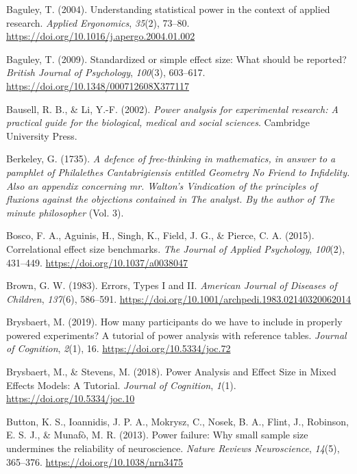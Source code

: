 \documentclass[
  english,
  ,jou, a4paper,floatsintext]{apa6}
\newlength{\cslhangindent}
\newenvironment{cslreferences}%
  {\setlength{\parindent}{0pt}%
  \everypar{\setlength{\hangindent}{\cslhangindent}}\ignorespaces}%
  {\par}
\begin{document}
\begin{cslreferences}
\leavevmode\hypertarget{ref-baguley_understanding_2004}{}%
Baguley, T. (2004). Understanding statistical power in the context of applied research. \emph{Applied Ergonomics}, \emph{35}(2), 73--80. \url{https://doi.org/10.1016/j.apergo.2004.01.002}

\leavevmode\hypertarget{ref-baguley_standardized_2009}{}%
Baguley, T. (2009). Standardized or simple effect size: What should be reported? \emph{British Journal of Psychology}, \emph{100}(3), 603--617. \url{https://doi.org/10.1348/000712608X377117}

\leavevmode\hypertarget{ref-bausell_power_2002}{}%
Bausell, R. B., \& Li, Y.-F. (2002). \emph{Power analysis for experimental research: A practical guide for the biological, medical and social sciences}. Cambridge University Press.

\leavevmode\hypertarget{ref-berkeley_defence_1735}{}%
Berkeley, G. (1735). \emph{A defence of free-thinking in mathematics, in answer to a pamphlet of Philalethes Cantabrigiensis entitled Geometry No Friend to Infidelity. Also an appendix concerning mr. Walton's Vindication of the principles of fluxions against the objections contained in The analyst. By the author of The minute philosopher} (Vol. 3).

\leavevmode\hypertarget{ref-bosco_correlational_2015}{}%
Bosco, F. A., Aguinis, H., Singh, K., Field, J. G., \& Pierce, C. A. (2015). Correlational effect size benchmarks. \emph{The Journal of Applied Psychology}, \emph{100}(2), 431--449. \url{https://doi.org/10.1037/a0038047}

\leavevmode\hypertarget{ref-brown_errors_1983}{}%
Brown, G. W. (1983). Errors, Types I and II. \emph{American Journal of Diseases of Children}, \emph{137}(6), 586--591. \url{https://doi.org/10.1001/archpedi.1983.02140320062014}

\leavevmode\hypertarget{ref-brysbaert_how_2019-1}{}%
Brysbaert, M. (2019). How many participants do we have to include in properly powered experiments? A tutorial of power analysis with reference tables. \emph{Journal of Cognition}, \emph{2}(1), 16. \url{https://doi.org/10.5334/joc.72}

\leavevmode\hypertarget{ref-brysbaert_power_2018}{}%
Brysbaert, M., \& Stevens, M. (2018). Power Analysis and Effect Size in Mixed Effects Models: A Tutorial. \emph{Journal of Cognition}, \emph{1}(1). \url{https://doi.org/10.5334/joc.10}

\leavevmode\hypertarget{ref-button_power_2013}{}%
Button, K. S., Ioannidis, J. P. A., Mokrysz, C., Nosek, B. A., Flint, J., Robinson, E. S. J., \& Munafò, M. R. (2013). Power failure: Why small sample size undermines the reliability of neuroscience. \emph{Nature Reviews Neuroscience}, \emph{14}(5), 365--376. \url{https://doi.org/10.1038/nrn3475}


\end{cslreferences}
\end{document}
